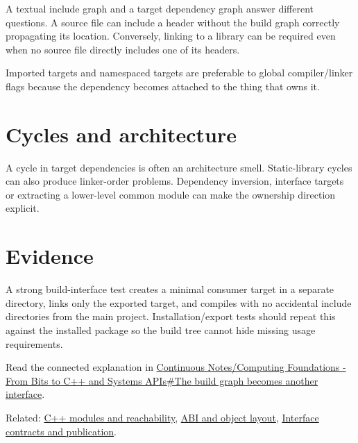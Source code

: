 A textual include graph and a target dependency graph answer different questions. A source file can include a header without the build graph correctly propagating its location. Conversely, linking to a library can be required even when no source file directly includes one of its headers.

Imported targets and namespaced targets are preferable to global compiler/linker flags because the dependency becomes attached to the thing that owns it.

\section{Cycles and architecture}\label{appendix-3327b8977adf-cycles-and-architecture}

A cycle in target dependencies is often an architecture smell. Static-library cycles can also produce linker-order problems. Dependency inversion, interface targets or extracting a lower-level common module can make the ownership direction explicit.

\section{Evidence}\label{appendix-3327b8977adf-evidence}

A strong build-interface test creates a minimal consumer target in a separate directory, links only the exported target, and compiles with no accidental include directories from the main project. Installation/export tests should repeat this against the installed package so the build tree cannot hide missing usage requirements.

Read the connected explanation in \href{Continuous\%20Notes/Computing\%20Foundations\%20-\%20From\%20Bits\%20to\%20C++\%20and\%20Systems\%20APIs\#The\%20build\%20graph\%20becomes\%20another\%20interface}{Continuous Notes/Computing Foundations - From Bits to C++ and Systems APIs\#The build graph becomes another interface}.

Related: \hyperref[appendix-410a611a5b8d]{C++ modules and reachability}, \hyperref[appendix-c4ac6bb0fff8]{ABI and object layout}, \hyperref[appendix-fdae7ff0a23f]{Interface contracts and publication}.
